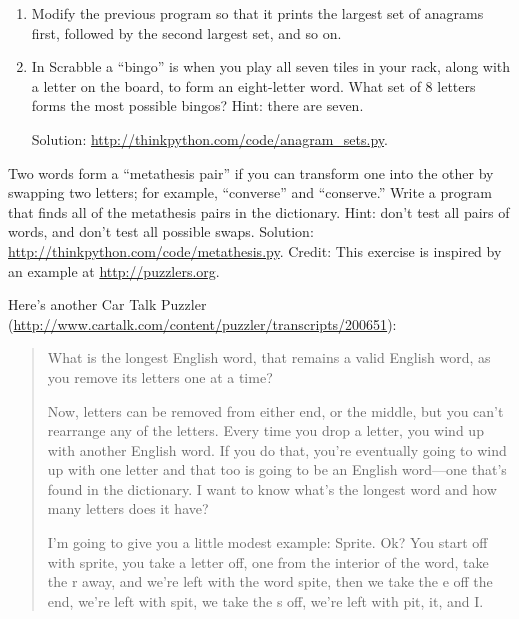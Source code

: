 \documentclass[10pt]{book}
\begin{document}
\begin{CJK}{UTF8}{gbsn}
\begin{exercise}
\begin{enumerate}
\item Modify the previous program so that it prints the largest set
of anagrams first, followed by the second largest set, and so on.

\item In Scrabble a ``bingo'' is when you play all seven tiles in
your rack, along with a letter on the board, to form an eight-letter
word.  What set of 8 letters forms the most possible bingos?
Hint: there are seven.


Solution: \url{http://thinkpython.com/code/anagram_sets.py}.

\end{enumerate}
\end{exercise}

\begin{exercise}

Two words form a ``metathesis pair'' if you can transform one into the
other by swapping two letters; for example, ``converse'' and
``conserve.''  Write a program that finds all of the metathesis pairs
in the dictionary.  Hint: don't test all pairs of words, and don't
test all possible swaps.  Solution: \url{http://thinkpython.com/code/metathesis.py}.
Credit: This exercise is inspired by an example at \url{http://puzzlers.org}.

\end{exercise}



\begin{exercise}

Here's another Car Talk Puzzler
(\url{http://www.cartalk.com/content/puzzler/transcripts/200651}):

\begin{quote}
What is the longest English word, that remains a valid English word,
as you remove its letters one at a time?

Now, letters can be removed from either end, or the middle, but you
can't rearrange any of the letters. Every time you drop a letter, you
wind up with another English word. If you do that, you're eventually
going to wind up with one letter and that too is going to be an
English word---one that's found in the dictionary. I want to know
what's the longest word and how many letters does it
have?

I'm going to give you a little modest example: Sprite. Ok? You start
off with sprite, you take a letter off, one from the interior of the
word, take the r away, and we're left with the word spite, then we
take the e off the end, we're left with spit, we take the s off, we're
left with pit, it, and I.
\end{quote}


\end{exercise}
\end{CJK}
\end{document}
